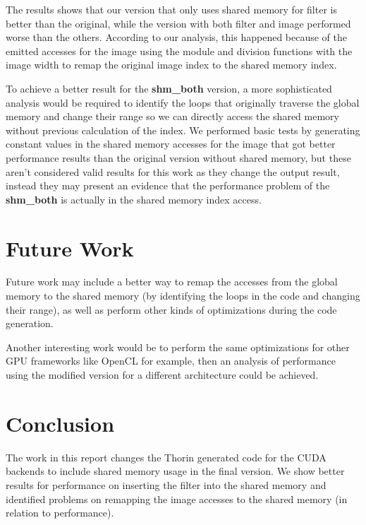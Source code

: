 \documentclass{article}
\begin{document}
The results shows that our version that only uses shared memory for filter is better than the original, while the version with both filter and image performed worse than the others. According to our analysis, this happened because of the emitted accesses for the image using the module and division functions with the image width to remap the original image index to the shared memory index.

To achieve a better result for the \textbf{shm\_both} version, a more sophisticated analysis would be required to identify the loops that originally traverse the global memory and change their range so we can directly access the shared memory without previous calculation of the index. We performed basic tests by generating constant values in the shared memory accesses for the image that got better performance results than the original version without shared memory, but these aren't considered valid results for this work as they change the output result, instead they may present an evidence that the performance problem of the \textbf{shm\_both} is actually in the shared memory index access.

\section{Future Work}
Future work may include a better way to remap the accesses from the global memory to the shared memory (by identifying the loops in the code and changing their range), as well as perform other kinds of optimizations during the code generation.

Another interesting work would be to perform the same optimizations for other GPU frameworks like OpenCL for example, then an analysis of performance using the modified version for a different architecture could be achieved.

\section{Conclusion}
The work in this report changes the Thorin generated code for the CUDA backends to include shared memory usage in the final version. We show better results for performance on inserting the filter into the shared memory and identified problems on remapping the image accesses to the shared memory (in relation to performance).
\end{document}
